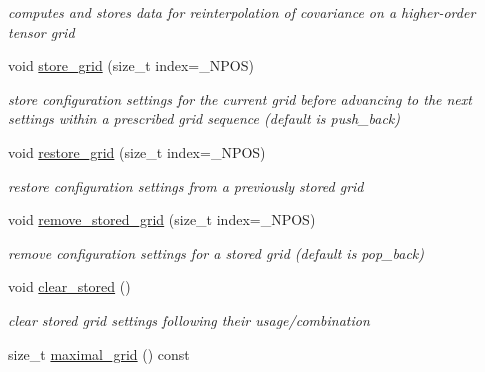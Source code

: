 \begin{DoxyCompactItemize}
\begin{DoxyCompactList}\small\item\em computes and stores data for reinterpolation of covariance on a higher-\/order tensor grid \end{DoxyCompactList}\item 
void \hyperlink{classPecos_1_1TensorProductDriver_aeae6e6d94a2e3e77d612eee151c77799}{store\+\_\+grid} (size\+\_\+t index=\+\_\+\+N\+P\+OS)\label{classPecos_1_1TensorProductDriver_aeae6e6d94a2e3e77d612eee151c77799}

\begin{DoxyCompactList}\small\item\em store configuration settings for the current grid before advancing to the next settings within a prescribed grid sequence (default is push\+\_\+back) \end{DoxyCompactList}\item 
void \hyperlink{classPecos_1_1TensorProductDriver_a31ba839ff630bbc25292b448fff38a73}{restore\+\_\+grid} (size\+\_\+t index=\+\_\+\+N\+P\+OS)\label{classPecos_1_1TensorProductDriver_a31ba839ff630bbc25292b448fff38a73}

\begin{DoxyCompactList}\small\item\em restore configuration settings from a previously stored grid \end{DoxyCompactList}\item 
void \hyperlink{classPecos_1_1TensorProductDriver_a93215ecdfbc51b7c45998fa4d65fc7fd}{remove\+\_\+stored\+\_\+grid} (size\+\_\+t index=\+\_\+\+N\+P\+OS)\label{classPecos_1_1TensorProductDriver_a93215ecdfbc51b7c45998fa4d65fc7fd}

\begin{DoxyCompactList}\small\item\em remove configuration settings for a stored grid (default is pop\+\_\+back) \end{DoxyCompactList}\item 
void \hyperlink{classPecos_1_1TensorProductDriver_ae4337960917eda26a5672e5c6afbb62a}{clear\+\_\+stored} ()\label{classPecos_1_1TensorProductDriver_ae4337960917eda26a5672e5c6afbb62a}

\begin{DoxyCompactList}\small\item\em clear stored grid settings following their usage/combination \end{DoxyCompactList}\item 
size\+\_\+t \hyperlink{classPecos_1_1TensorProductDriver_a6edda8aad31eb8a64e180e6a76a6e0e9}{maximal\+\_\+grid} () const \label{classPecos_1_1TensorProductDriver_a6edda8aad31eb8a64e180e6a76a6e0e9}


\end{DoxyCompactItemize}
